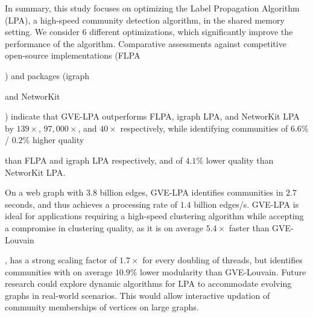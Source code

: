 
In summary, this study focuses on optimizing the Label Propagation Algorithm (LPA), a high-speed community detection algorithm, in the shared memory setting. We consider 6 different optimizations, which significantly improve the performance of the algorithm. Comparative assessments against competitive open-source implementations (FLPA) and packages (igraph and NetworKit) indicate that GVE-LPA outperforms FLPA, igraph LPA, and NetworKit LPA by $139\times$, $97,000\times$, and $40\times$ respectively, while identifying communities of $6.6\%$ / $0.2\%$ higher quality than FLPA and igraph LPA respectively, and of $4.1\%$ lower quality than NetworKit LPA.

On a web graph with $3.8$ billion edges, GVE-LPA identifies communities in $2.7$ seconds, and thus achieves a processing rate of $1.4$ billion edges/s. GVE-LPA is ideal for applications requiring a high-speed clustering algorithm while accepting a compromise in clustering quality, as it is on average $5.4\times$ faster than GVE-Louvain, has a strong scaling factor of $1.7\times$ for every doubling of threads, but identifies communities with on average $10.9\%$ lower modularity than GVE-Louvain. Future research could explore dynamic algorithms for LPA to accommodate evolving graphs in real-world scenarios. This would allow interactive updation of community memberships of vertices on large graphs.
